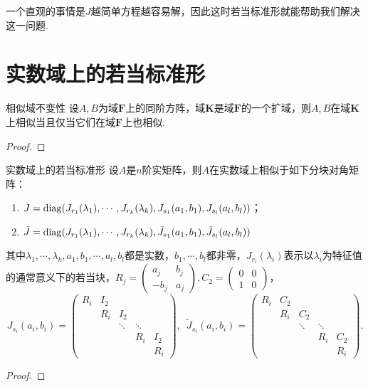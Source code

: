 一个直观的事情是$J$越简单方程越容易解，因此这时若当标准形就能帮助我们解决这一问题.

\section{实数域上的若当标准形} \label{sec:实数域上的若当标准形}

\begin{theorem}{}{相似域不变性}
    设$A,B$为域$\mathbf{F}$上的同阶方阵，域$\mathbf{K}$是域$\mathbf{F}$的一个扩域，则$A,B$在域$\mathbf{K}$上相似当且仅当它们在域$\mathbf{F}$上也相似.
\end{theorem}
\begin{proof}

\end{proof}

\begin{theorem}{}{实数域上的若当标准形}
    设$A$是$n$阶实矩阵，则$A$在实数域上相似于如下分块对角矩阵：
    \begin{enumerate}
        \item $J=\operatorname{diag}(J_{r_1}(\lambda_1),\cdots,J_{r_k}(\lambda_k),J_{s_1}(a_1,b_1),J_{s_l}(a_l,b_l))$；
        \item $\tilde{J}=\operatorname{diag}(J_{r_1}(\lambda_1),\cdots,J_{r_k}(\lambda_k),\tilde{J}_{s_1}(a_1,b_1),\tilde{J}_{s_l}(a_l,b_l))$
    \end{enumerate}
    其中$\lambda_1,\cdots,\lambda_k,a_1,b_1,\cdots,a_l,b_l$都是实数，$b_1,\cdots,b_l$都非零，$J_{r_i}(\lambda_i)$表示以$\lambda_i$为特征值的通常意义下的若当块，$R_j=\begin{pmatrix}
            a_j & b_j \\ -b_j & a_j
        \end{pmatrix},C_2=\begin{pmatrix}
            0 & 0 \\ 1 & 0
        \end{pmatrix}$，
    \[J_{s_i}(a_i,b_i)=\begin{pmatrix}
            R_i & I_2 &        &        &     \\
                & R_i & I_2    &        &     \\
                &     & \ddots & \ddots &     \\
                &     &        & R_i    & I_2 \\
                &     &        &        & R_i
        \end{pmatrix},\enspace \tilde{J}_{s_i}(a_i,b_i)=\begin{pmatrix}
            R_i & C_2 &        &        &     \\
                & R_i & C_2    &        &     \\
                &     & \ddots & \ddots &     \\
                &     &        & R_i    & C_2 \\
                &     &        &        & R_i
        \end{pmatrix}.\]
\end{theorem}
\begin{proof}

\end{proof}

